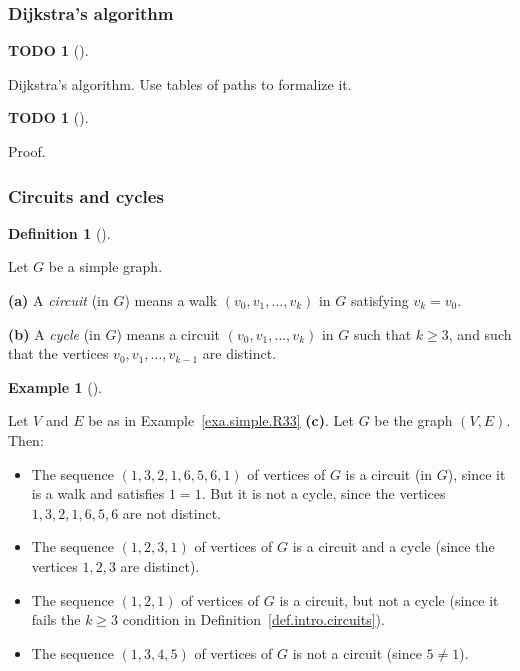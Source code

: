 \documentclass[numbers=enddot,12pt,final,onecolumn,notitlepage]{scrartcl}%
\theoremstyle{definition}
\newtheorem{defi}[theo]{Definition}
\newenvironment{definition}[1][]
{\begin{defi}[#1]\begin{leftbar}}
{\end{leftbar}\end{defi}}
\newtheorem{exam}[theo]{Example}
\newenvironment{example}[1][]
{\begin{exam}[#1]\begin{leftbar}}
{\end{leftbar}\end{exam}}
\newtheorem{quest}[theo]{TODO}
\newenvironment{todo}[1][]
{\begin{quest}[#1]\begin{leftbar}}
{\end{leftbar}\end{quest}}
\newcommand{\tup}[1]{\left( #1 \right)}
\begin{document}
\subsubsection{Dijkstra's algorithm}

\begin{todo}
Dijkstra's algorithm. Use tables of paths to formalize it.
\end{todo}

\begin{todo}
Proof.
\end{todo}

\subsubsection{Circuits and cycles}

\begin{definition} \label{def.intro.circuits}
Let $G$ be a simple graph.

\textbf{(a)} A \textit{circuit} (in $G$) means a walk
$\tup{v_0, v_1, \ldots, v_k}$ in $G$ satisfying $v_k = v_0$.

\textbf{(b)} A \textit{cycle} (in $G$) means a circuit
$\tup{v_0, v_1, \ldots, v_k}$ in $G$ such that $k \geq 3$, and such
that the vertices $v_0, v_1, \ldots, v_{k-1}$ are distinct.
\end{definition}

\begin{example} \label{exa.intro.circuits}
Let $V$ and $E$ be as in Example~\ref{exa.simple.R33} \textbf{(c)}.
Let $G$ be the graph $\tup{V, E}$. Then:

\begin{itemize}
\item The sequence $\tup{1, 3, 2, 1, 6, 5, 6, 1}$ of vertices of $G$
is a circuit (in $G$), since it is a walk and satisfies $1 = 1$.
But it is not a cycle, since the vertices $1, 3, 2, 1, 6, 5, 6$ are
not distinct.

\item The sequence $\tup{1, 2, 3, 1}$ of vertices of $G$ is a circuit
and a cycle (since the vertices $1, 2, 3$ are distinct).

\item The sequence $\tup{1, 2, 1}$ of vertices of $G$ is a circuit,
but not a cycle (since it fails the $k \geq 3$ condition in
Definition~\ref{def.intro.circuits}).

\item The sequence $\tup{1, 3, 4, 5}$ of vertices of $G$ is not a
circuit (since $5 \neq 1$).
\end{itemize}
\end{example}
\end{document}
